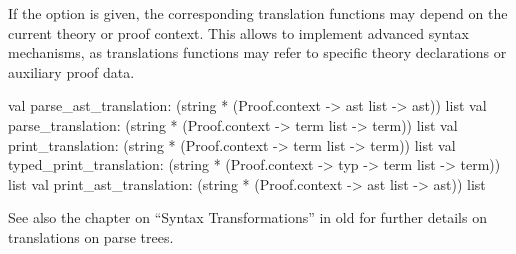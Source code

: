 \begin{isabellebody}
\begin{isamarkuptext}
  If the  option is given, the corresponding
  translation functions may depend on the current theory or proof
  context.  This allows to implement advanced syntax mechanisms, as
  translations functions may refer to specific theory declarations or
  auxiliary proof data.

\begin{ttbox}
val parse_ast_translation:
  (string * (Proof.context -> ast list -> ast)) list
val parse_translation:
  (string * (Proof.context -> term list -> term)) list
val print_translation:
  (string * (Proof.context -> term list -> term)) list
val typed_print_translation:
  (string * (Proof.context -> typ -> term list -> term)) list
val print_ast_translation:
  (string * (Proof.context -> ast list -> ast)) list
\end{ttbox}

  \medskip See also the chapter on ``Syntax Transformations'' in old
  \cite{isabelle-ref} for further details on translations on parse
  trees.%
\end{isamarkuptext}%
\isamarkuptrue%
%
\isadelimtheory
%
\endisadelimtheory
%
\isatagtheory
{}\isamarkupfalse%
%
\endisatagtheory
{\isafoldtheory}%
%
\isadelimtheory
%
\endisadelimtheory
\isanewline
\end{isabellebody}%
